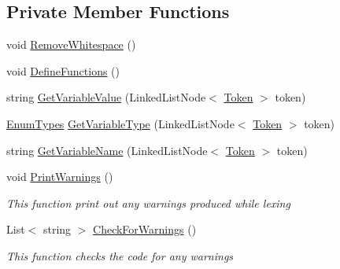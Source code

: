 \subsection*{Private Member Functions}
\begin{DoxyCompactItemize}
\item 
void \hyperlink{class_c_p_u___o_s___simulator_1_1_compiler_1_1_frontend_1_1_lexer_aa2cc4a7f138f9c6b8bda051eb08cd0e6}{Remove\+Whitespace} ()
\item 
void \hyperlink{class_c_p_u___o_s___simulator_1_1_compiler_1_1_frontend_1_1_lexer_a20ba99982182d2482f56f46d4d661a7d}{Define\+Functions} ()
\item 
string \hyperlink{class_c_p_u___o_s___simulator_1_1_compiler_1_1_frontend_1_1_lexer_a40799e3f75747b0e6e7bc7e3dc5a3856}{Get\+Variable\+Value} (Linked\+List\+Node$<$ \hyperlink{class_c_p_u___o_s___simulator_1_1_compiler_1_1_frontend_1_1_tokens_1_1_token}{Token} $>$ token)
\item 
\hyperlink{namespace_c_p_u___o_s___simulator_1_1_compiler_1_1_frontend_1_1_tokens_a7c0cc43763cc9d01c7d5af34d70b96ea}{Enum\+Types} \hyperlink{class_c_p_u___o_s___simulator_1_1_compiler_1_1_frontend_1_1_lexer_a51100f91cf5093df274114f32d210a91}{Get\+Variable\+Type} (Linked\+List\+Node$<$ \hyperlink{class_c_p_u___o_s___simulator_1_1_compiler_1_1_frontend_1_1_tokens_1_1_token}{Token} $>$ token)
\item 
string \hyperlink{class_c_p_u___o_s___simulator_1_1_compiler_1_1_frontend_1_1_lexer_a9654723fcd32311aefbfcfbc0888e4bc}{Get\+Variable\+Name} (Linked\+List\+Node$<$ \hyperlink{class_c_p_u___o_s___simulator_1_1_compiler_1_1_frontend_1_1_tokens_1_1_token}{Token} $>$ token)
\item 
void \hyperlink{class_c_p_u___o_s___simulator_1_1_compiler_1_1_frontend_1_1_lexer_a024d4fa0d9659b9ac9f7446baa7e99ba}{Print\+Warnings} ()
\begin{DoxyCompactList}\small\item\em This function print out any warnings produced while lexing \end{DoxyCompactList}\item 
List$<$ string $>$ \hyperlink{class_c_p_u___o_s___simulator_1_1_compiler_1_1_frontend_1_1_lexer_a3cb07219d31cbf42ce171abf1af266be}{Check\+For\+Warnings} ()
\begin{DoxyCompactList}\small\item\em This function checks the code for any warnings \end{DoxyCompactList}\item 

\end{DoxyCompactItemize}
